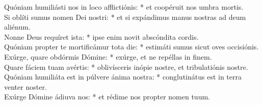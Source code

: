 {	Quóniam humiliásti nos in loco afflictiónis: * et coopéruit nos umbra mortis. \\
	Si oblíti sumus nomen Dei nostri: * et si expándimus manus nostras ad deum aliénum. \\
	Nonne Deus requíret ista: * ipse enim novit abscóndita cordis. \\
	Quóniam propter te mortificámur tota die: * estimáti sumus sicut oves occisiónis. \\
	Exúrge, quare obdórmis Dómine: * exúrge, et ne repéllas in finem. \\
	Quare fáciem tuam avértis: * oblivísceris inópie nostre, et tribulatiónis nostre. \\
	Quóniam humiliáta est in púlvere ánima nostra: * conglutinátus est in terra venter noster. \\
	Exúrge Dómine ádiuva nos: * et rédime nos propter nomen tuum.
}

